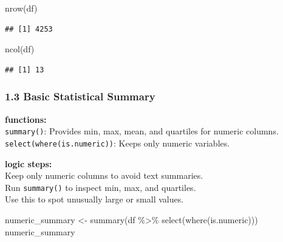 \documentclass[
]{article}
\newenvironment{Shaded}{\begin{snugshade}}{\end{snugshade}}
\newcommand{\FunctionTok}[1]{\textcolor[rgb]{0.00,0.00,0.00}{#1}}
\newcommand{\NormalTok}[1]{#1}
\newcommand{\OtherTok}[1]{\textcolor[rgb]{0.56,0.35,0.01}{#1}}
\newcommand{\SpecialCharTok}[1]{\textcolor[rgb]{0.00,0.00,0.00}{#1}}
\begin{document}
\begin{Shaded}
\begin{Highlighting}[]
\FunctionTok{nrow}\NormalTok{(df)}
\end{Highlighting}
\end{Shaded}

\begin{verbatim}
## [1] 4253
\end{verbatim}

\begin{Shaded}
\begin{Highlighting}[]
\FunctionTok{ncol}\NormalTok{(df)}
\end{Highlighting}
\end{Shaded}

\begin{verbatim}
## [1] 13
\end{verbatim}

\hypertarget{basic-statistical-summary}{%
\subsubsection{1.3 Basic Statistical
Summary}\label{basic-statistical-summary}}

\textbf{functions:}\\
\texttt{summary()}: Provides min, max, mean, and quartiles for numeric
columns.\\
\texttt{select(where(is.numeric))}: Keeps only numeric variables.

\textbf{logic steps:}\\
Keep only numeric columns to avoid text summaries.\\
Run \texttt{summary()} to inspect min, max, and quartiles.\\
Use this to spot unusually large or small values.

\begin{Shaded}
\begin{Highlighting}[]
\NormalTok{numeric\_summary }\OtherTok{\textless{}{-}} \FunctionTok{summary}\NormalTok{(df }\SpecialCharTok{\%\textgreater{}\%} \FunctionTok{select}\NormalTok{(}\FunctionTok{where}\NormalTok{(is.numeric)))}
\NormalTok{numeric\_summary}
\end{Highlighting}
\end{Shaded}
\end{document}
